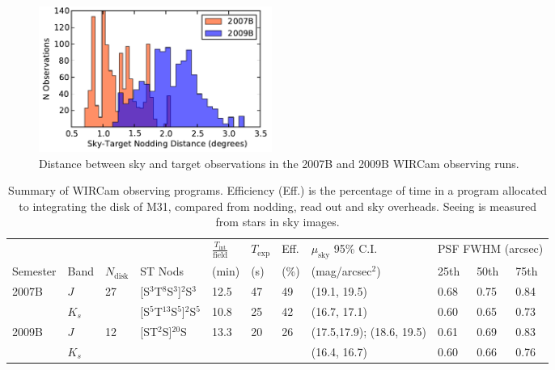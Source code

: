 \documentclass[iop]{emulateapj}
\begin{document}
\begin{figure}[t]
    \centering
        \includegraphics[width=3in]{figs/sky_target_dist}
    \caption{Distance between sky and target observations in the 2007B and 2009B WIRCam observing runs.}
    \label{fig:sky_target_dist}
\end{figure}


\begin{table}[t]
    \caption[Summary of WIRCam observing programs]{Summary of WIRCam observing programs. Efficiency (Eff.) is the percentage of time in a program allocated to integrating the disk of M31, compared from nodding, read out and sky overheads. Seeing is measured from stars in sky images.}
    \label{tab:obssummary}
    
    \centering
    \begin{tabular}{lllllllllll}
        & & & & $\frac{T_\mathrm{int}}{\mathrm{field}}$ & $T_\mathrm{exp}$ & Eff. & $\mu_\mathrm{sky}$ 95\% C.I. & \multicolumn{3}{c}{PSF FWHM (arcsec)} \\ \cline{9-11}
    Semester & Band & $N_\mathrm{disk}$ & ST Nods & (min) &  (s) &  (\%) & (mag/arcsec$^2$) & 25th  & 50th & 75th \\
    \hline
    \multirow{2}{*}{2007B} & $J$ & \multirow{2}{*}{27} & [S$^3$T$^8$S$^3$]$^{2}$S$^3$ & 12.5 & 47 & 49 & (19.1, 19.5) & 0.68 & 0.75 & 0.84 \\
     & $K_s$ &  & [S$^5$T$^{13}$S$^5$]${^2}$S$^5$ & 10.8 & 25 & 42 & (16.7, 17.1) & 0.60 &  0.65 & 0.73 \\
     \hline
     \multirow{2}{*}{2009B} & $J$ & \multirow{2}{*}{12} & \multirow{2}{*}{[ST$^2$S]$^{20}$S} & \multirow{2}{*}{13.3} & \multirow{2}{*}{20} & \multirow{2}{*}{26} & (17.5,17.9); (18.6, 19.5) & 0.61 & 0.69 & 0.83 \\
      & $K_s$ & & & & & & (16.4, 16.7) & 0.60 & 0.66 & 0.76 \\
    \end{tabular}
\end{table}
\end{document}
